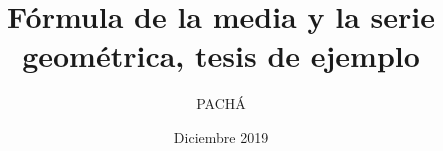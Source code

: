 \documentclass[12pt,reqno,oneside,pdftex]{formato-puc/puctesis} %
\begin{document}


\title{Fórmula de la media y la serie geométrica, tesis de ejemplo}
\author{PACHÁ}

\address{Facultad de Derecho\\
         Pontificia Universidad Cat\'olica de Chile\\ 
         Vicu\~na Mackenna 4860\\
         Santiago, Chile\\
         {\it Tel.\/} : 56 (2) 354-2000}
\subject      {Estimación de parámetros}
\date         {Diciembre 2019}
\dedication   {A mi familia, amigos y personas valiosas de la universidad}


\PageNumbersFootCentered       %
\maketitle



\end{document}
